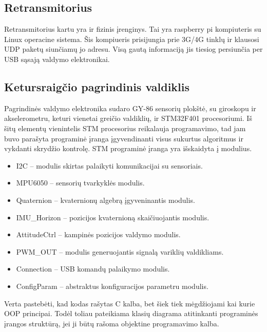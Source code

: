 \documentclass[12pt, a4paper, lithuanian, final]{article}
\begin{document}
\subsection{Retransmitorius}

Retransmitorius kartu yra ir fizinis įrenginys.
Tai yra raspberry pi kompiuteris su Linux operacine sistema.
Šis kompiueris prisijungia prie 3G/4G tinklų ir klausosi UDP paketų siunčiamų jo adresu.
Visą gautą informaciją jis tiesiog persiunčia per USB sąsają valdymo elektronikai.

\subsection{Ketursraigčio pagrindinis valdiklis}

Pagrindinės valdymo elektronika sudaro GY-86 sensorių plokštė, su giroskopu ir akselerometru, keturi vienetai greičio valdiklių, ir STM32F401 procesoriumi.
Iš šitų elementų vienintelis STM procesorius reikalauja programavimo, tad jam buvo parašyta programinė įranga įgyvendinanti visus sukurtus algoritmus ir vykdanti skrydžio kontrolę.
STM programinė įranga yra išskaidyta į modulius.

\begin{itemize}
	\item I2C -- modulis skirtas palaikyti komunikacijai su sensoriais.
	\item MPU6050 -- sensorių tvarkyklės modulis.
	\item Quaternion -- kvaternionų algebrą įgyveninantis modulis.
	\item IMU\_Horizon -- pozicijos kvaternioną skaičiuojantis modulis.
	\item AttitudeCtrl -- kampinės pozicijos valdymo modulis.
	\item PWM\_OUT -- modulis generuojantis signalą variklių valdikliams.
	\item Connection -- USB komandų palaikymo modulis.
	\item ConfigParam -- abstraktus konfiguracijos parametru modulis.
\end{itemize}


Verta pastebėti, kad kodas rašytas C kalba, bet šiek tiek mėgdžiojami kai kurie OOP principai.
Todėl toliau pateikiama klasių diagrama atitinkanti programinės įrangos struktūrą, jei ji būtų rašoma objektine programavimo kalba.
\end{document}
